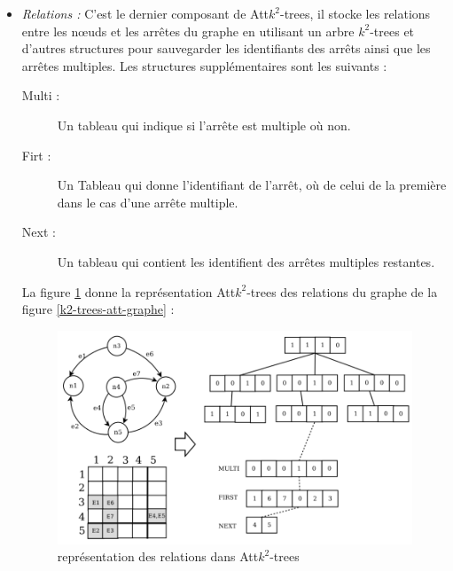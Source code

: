 \begin{itemize}
\item \textit{Relations :} C'est le dernier composant de Att$k^2$-trees, il stocke les relations entre les nœuds et les arrêtes du graphe en utilisant un arbre $k^2$-trees et d'autres structures pour sauvegarder les identifiants des arrêts ainsi que les arrêtes multiples. Les structures supplémentaires sont les suivants :
\begin{description}
\item[Multi :] Un tableau qui indique si l'arrête est multiple où non.
\item[Firt :] Un Tableau qui donne l'identifiant de l'arrêt, où de celui de la première dans le cas d'une arrête multiple.
\item[Next :] Un tableau qui contient les identifient des arrêtes multiples restantes.
\end{description}
La figure \ref{k2-trees-att-relation} donne la représentation Att$k^2$-trees des relations du graphe de la figure \ref{k2-trees-att-graphe} :
\begin{figure}[H]
\begin{center}
\includegraphics[height=200 pt, width=280 pt]{./ressources/image/k2-trees-att-relation.png} 
\end{center}
\caption{représentation des relations dans Att$k^2$-trees}
\label{k2-trees-att-relation}
\end{figure} 
\end{itemize}

